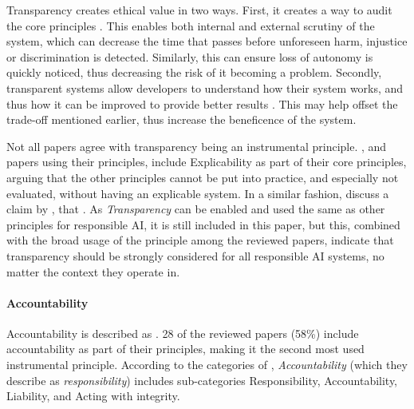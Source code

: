 Transparency creates ethical value in two ways. First, it creates a way to audit the core principles \parencite{Canca_2020}. This enables both internal and external scrutiny of the system, which can decrease the time that passes before unforeseen harm, injustice or discrimination is detected. Similarly, this can ensure loss of autonomy is quickly noticed, thus decreasing the risk of it becoming a problem. Secondly, transparent systems allow developers to understand how their system works, and thus how it can be improved to provide better results \parencite{BarredoArrieta_2020}. This may help offset the trade-off mentioned earlier, thus increase the beneficence of the system.

Not all papers agree with transparency being an instrumental principle. \textcite{Floridi_2018}, and papers using their principles, include Explicability as part of their core principles, arguing that the other principles cannot be put into practice, and especially not evaluated, without having an explicable system. In a similar fashion, \textcite{Jobin_2019} discuss a claim by \textcite{Turilli_2009}, that  \parencite[p.~105]{Turilli_2009}. As \textit{Transparency} can be enabled and used the same as other principles for responsible AI, it is still included in this paper, but this, combined with the broad usage of the principle among the reviewed papers, indicate that transparency should be strongly considered for all responsible AI systems, no matter the context they operate in.


\paragraph{Accountability}
Accountability is described as  \parencite[p.~36]{Anagnostou_2022}. 28 of the reviewed papers (58\%) include accountability as part of their principles, making it the second most used instrumental principle. According to the categories of \textcite{Ryan_2021}, \textit{Accountability} (which they describe as \textit{responsibility}) includes sub-categories Responsibility, Accountability, Liability, and Acting with integrity.

